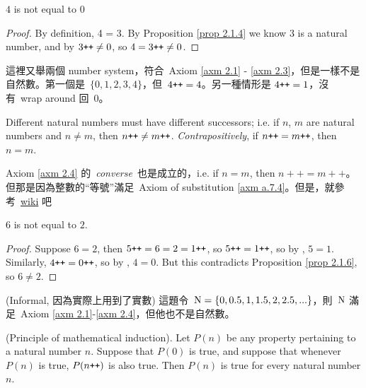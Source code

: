 \begin{proposition}\label{prop 2.1.6}
\(4\) is not equal to \(0\)
\end{proposition}
\begin{proof}
By definition, 4 = 3\INC. By Proposition \ref{prop 2.1.4} we know 3 is a natural number, and by  \(3\texttt{++} \neq 0\), so \(4 = 3\texttt{++} \neq 0\).
\end{proof}

\begin{example}\label{example 2.1.7}
這裡又舉兩個 number system，符合\ Axiom \ref{axm 2.1} - \ref{axm 2.3}，但是一樣不是自然數。第一個是\ \(\{0,1,2,3,4\}\)，但\ \(4\texttt{++} = 4\)。另一種情形是 \(4\texttt{++} = 1\)，沒有\ wrap around 回\ 0。
\end{example}

\begin{axiom}\label{axm 2.4}
Different natural numbers must have different successors; i.e. if \(n\), \(m\) are natural numbers and \(n \neq m\), then \(n\texttt{++} \neq m\texttt{++}\). \emph{Contrapositively}, if \(n\texttt{++} = m\texttt{++}\), then \(n = m\).
\end{axiom}

\begin{note}
Axiom \ref{axm 2.4} 的\ \emph{converse}\ 也是成立的，i.e. if \(n = m\), then \(n++ = m++\)。但那是因為整數的``等號''滿足\ Axiom of substitution \ref{axm a.7.4}。但是，就參考\ \href{https://www.wikiwand.com/en/Peano_axioms#/Formulation}{wiki} 吧
\end{note}

\begin{proposition}\label{prop 2.1.8}
\(6\) is not equal to \(2\).
\end{proposition}
\begin{proof}
Suppose \(6 = 2\), then \(5\texttt{++} = 6 = 2 = 1\texttt{++}\), so \(5\texttt{++} = 1\texttt{++} \), so by , \(5 = 1\). Similarly, \(4\texttt{++} = 0\texttt{++}\), so by , \(4 = 0\). But this contradicts Proposition \ref{prop 2.1.6}, so \(6 \neq 2\).
\end{proof}

\begin{example}\label{example 2.1.9}(Informal, 因為實際上用到了實數)
這題令\ \( \textup{N} = \{0, 0.5, 1, 1.5, 2, 2.5, ...\}\)，則\ \(\textup{N}\) 滿足\ Axiom \ref{axm 2.1}-\ref{axm 2.4}，但他也不是自然數。
\end{example}

\begin{axiom}\label{axm 2.5} (Principle of mathematical induction). Let \(P(n)\) be any property pertaining to a natural number \(n\). Suppose that \(P(0)\) is true, and suppose that whenever \(P(n)\) is true, \(P(n\texttt{++})\) is also true. Then \(P(n)\) is true for every natural number \(n\).
\end{axiom}

